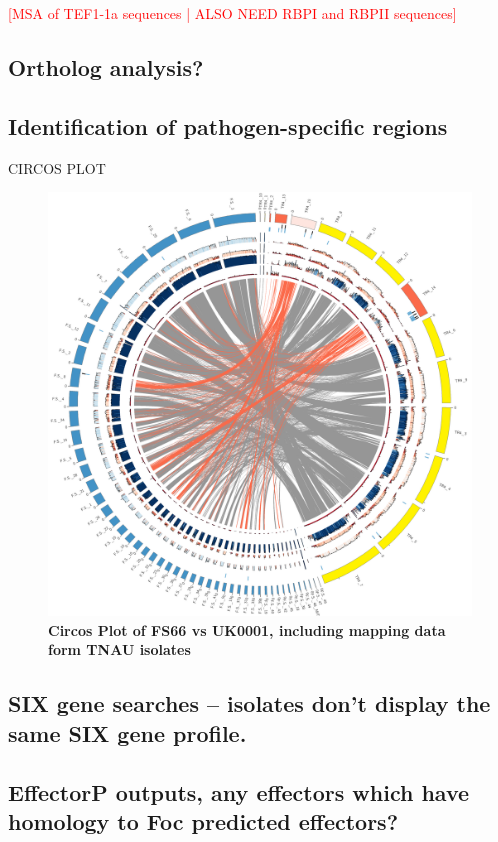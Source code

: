 \textcolor{red}{[MSA of TEF1-1a sequences | ALSO NEED RBPI and RBPII sequences]}

\subsection{Ortholog analysis?}

\subsection{Identification of pathogen-specific regions}
CIRCOS PLOT

\begin{figure}[htp!]
  \centering
  \includegraphics[width=15cm]{Figures/circos.png}
  \caption[Circos Plot of FS66 vs UK0001, including mapping data form TNAU isolates]{\textbf{Circos Plot of FS66 vs UK0001, including mapping data form TNAU isolates}}
  \label{TNAUCircos}
\end{figure}


\subsection{SIX gene searches – isolates don’t display the same SIX gene profile.}

\subsection{EffectorP outputs, any effectors which have homology to Foc predicted effectors?}


